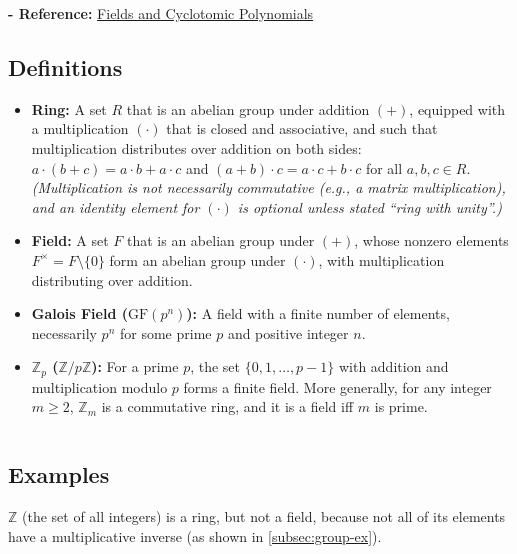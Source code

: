 \textbf{- Reference:} 
\href{https://e.math.cornell.edu/people/belk/numbertheory/CyclotomicPolynomials.pdf}{Fields and Cyclotomic Polynomials}~\cite{cyclotomic-polynomial}

\subsection{Definitions}
\label{subsec:field-def}

\begin{tcolorbox}[title={\textbf{\tboxdef{\ref*{subsec:field-def}} Field Definitions}}]
\begin{itemize}
\item \textbf{Ring:} A set $R$ that is an abelian group under addition $(+)$, equipped with a multiplication $(\cdot)$ that is closed and associative, and such that multiplication distributes over addition on both sides: $a\cdot(b+c)=a\cdot b+a\cdot c$ and $(a+b)\cdot c=a\cdot c+b\cdot c$ for all $a,b,c\in R$. \emph{(Multiplication is not necessarily commutative (e.g., a matrix multiplication), and an identity element for $(\cdot)$ is optional unless stated “ring with unity”.)}
\item \textbf{Field:} A set $F$ that is an abelian group under $(+)$, whose nonzero elements $F^\times=F\setminus\{0\}$ form an abelian group under $(\cdot)$, with multiplication distributing over addition.
\item \textbf{Galois Field ($\mathrm{GF}(p^n)$):} A field with a finite number of elements, necessarily $p^n$ for some prime $p$ and positive integer $n$.
\item \textbf{$\mathbb{Z}_p$ ($\mathbb{Z}/p\mathbb{Z}$):} For a prime $p$, the set $\{0,1,\ldots,p-1\}$ with addition and multiplication modulo $p$ forms a finite field. More generally, for any integer $m\ge 2$, $\mathbb{Z}_m$ is a commutative ring, and it is a field iff $m$ is prime.\end{itemize}
\end{tcolorbox}

$ $

\subsection{Examples}
\label{subsec:field-ex}

$\mathbb{Z}$ (the set of all integers) is a ring, but not a field, because not all of its elements have a multiplicative inverse (as shown in \autoref{subsec:group-ex}). 

$ $

